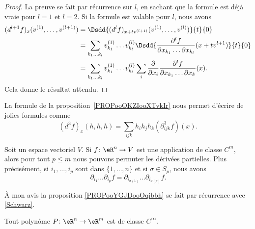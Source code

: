 \begin{proof}
	La preuve se fait par récurrence sur \( l\), en sachant que la formule est déjà vraie pour \( l=1\) et \( l=2\). Si la formule est valable pour \( l\), nous avons
	\begin{subequations}
		\begin{align}
			(d^{l+1}f)_x(v^{(1)},\ldots, v^{(l+1)}) & =\Dsdd{ (d^lf)_{x+tv^{(l+1)}}(v^{(1)},\ldots, v^{(l)}) }{t}{0}                                                                                                \\
			                                        & =\sum_{k_1\ldots k_l}v_{k_1}^{(1)}\ldots v_{k_l}^{(l)}\Dsdd{   \frac{ \partial^lf }{ \partial x_{k_1}\ldots \partial x_{k_l} }(x+tv^{l+1})   }{t}{0}          \\
			                                        & =\sum_{k_1\ldots k_l}v_{k_1}^{(1)}\ldots v_{k_l}^{(l)}\sum_i\frac{ \partial  }{ \partial x_i }\frac{ \partial^lf }{ \partial x_{k_1}\ldots \partial x_k }(x).
		\end{align}
	\end{subequations}
	Cela donne le résultat attendu.
\end{proof}

\begin{normaltext}
	La formule de la proposition~\ref{PROPooQKZIooXTvkIr} nous permet d'écrire de jolies formules comme
	\begin{equation}        \label{EQooXRWWooMoKoOB}
		(d^3f)_x(h,h,h)=\sum_{ijk}h_ih_jh_k(\partial^3_{ijk}f)(x).
	\end{equation}
\end{normaltext}

\begin{proposition}		\label{PROPooYGJDooOqibbh}
	Soit un espace vectoriel \( V\). Si \(f \colon \eR^n\to  V  \) est une application de classe \( C^m\), alors pour tout \( p\leq m\) nous pouvons permuter les dérivées partielles. Plus précisément, si \( i_1,\ldots, i_p\) sont dans \(\{ 1,\ldots,n \} \) et si \( \sigma\in S_p\), nous avons
	\begin{equation}
		\partial_{i_1}\ldots \partial_{i_p}f=\partial_{i_{\sigma(1)}}\ldots \partial_{i_{\sigma(p)}}f.
	\end{equation}
\end{proposition}


\ssdem
À mon avis la proposition \ref{PROPooYGJDooOqibbh} se fait par récurrence avec \ref{Schwarz}.		%


\begin{proposition}		\label{PROPooMGFBooHWGXyC}
	Tout polynôme \(P \colon \eR^n\to \eR^m  \) est de classe \( C^{\infty}\).
\end{proposition}

